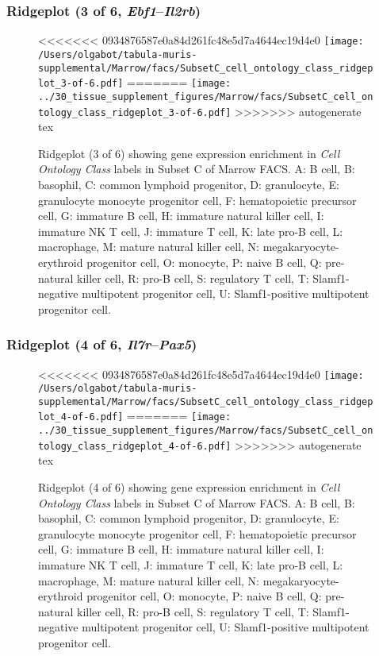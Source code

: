 \clearpage

\subsubsection{Ridgeplot (3 of 6, \emph{Ebf1}--\emph{Il2rb})}
\begin{figure}[h]
\centering
<<<<<<< 0934876587e0a84d261fc48e5d7a4644ec19d4e0
\texttt{[image: /Users/olgabot/tabula-muris-supplemental/Marrow/facs/SubsetC\_cell\_ontology\_class\_ridgeplot\_3-of-6.pdf]}
=======
\texttt{[image: ../30\_tissue\_supplement\_figures/Marrow/facs/SubsetC\_cell\_ontology\_class\_ridgeplot\_3-of-6.pdf]}
>>>>>>> autogenerate tex

\caption{ Ridgeplot (3 of 6)  showing gene expression enrichment in \emph{Cell Ontology Class} labels in Subset C of Marrow FACS. A: B cell, B: basophil, C: common lymphoid progenitor, D: granulocyte, E: granulocyte monocyte progenitor cell, F: hematopoietic precursor cell, G: immature B cell, H: immature natural killer cell, I: immature NK T cell, J: immature T cell, K: late pro-B cell, L: macrophage, M: mature natural killer cell, N: megakaryocyte-erythroid progenitor cell, O: monocyte, P: naive B cell, Q: pre-natural killer cell, R: pro-B cell, S: regulatory T cell, T: Slamf1-negative multipotent progenitor cell, U: Slamf1-positive multipotent progenitor cell.}
\end{figure}


\clearpage

\subsubsection{Ridgeplot (4 of 6, \emph{Il7r}--\emph{Pax5})}
\begin{figure}[h]
\centering
<<<<<<< 0934876587e0a84d261fc48e5d7a4644ec19d4e0
\texttt{[image: /Users/olgabot/tabula-muris-supplemental/Marrow/facs/SubsetC\_cell\_ontology\_class\_ridgeplot\_4-of-6.pdf]}
=======
\texttt{[image: ../30\_tissue\_supplement\_figures/Marrow/facs/SubsetC\_cell\_ontology\_class\_ridgeplot\_4-of-6.pdf]}
>>>>>>> autogenerate tex

\caption{ Ridgeplot (4 of 6)  showing gene expression enrichment in \emph{Cell Ontology Class} labels in Subset C of Marrow FACS. A: B cell, B: basophil, C: common lymphoid progenitor, D: granulocyte, E: granulocyte monocyte progenitor cell, F: hematopoietic precursor cell, G: immature B cell, H: immature natural killer cell, I: immature NK T cell, J: immature T cell, K: late pro-B cell, L: macrophage, M: mature natural killer cell, N: megakaryocyte-erythroid progenitor cell, O: monocyte, P: naive B cell, Q: pre-natural killer cell, R: pro-B cell, S: regulatory T cell, T: Slamf1-negative multipotent progenitor cell, U: Slamf1-positive multipotent progenitor cell.}
\end{figure}


